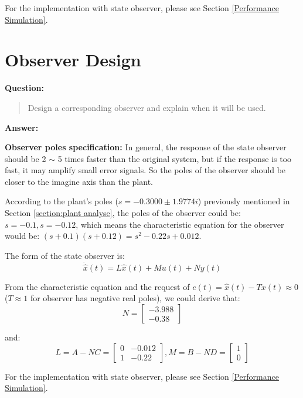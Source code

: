 \documentclass[12pt, oneside]{article}
\begin{document}
For the implementation with state observer, please see Section \ref{Performance Simulation}.


\section{Observer Design}
\textbf{Question:}
\begin{quote}
Design a corresponding observer and explain when it will be used. 
\end{quote}
\textbf{Answer:}

\textbf{Observer poles specification:} In general, the response of the state observer should be 2 $\sim$ 5 times faster than the original system, but if the response is too fast, it may amplify small error signals. So the poles of the observer should be closer to the imagine axis than the plant.

According to the plant's poles ($s = -0.3000\pm1.9774i$) previously mentioned in Section \ref{section:plant analyse}, the poles of the observer could be: $s=-0.1, s=-0.12$, which means the characteristic equation for the observer would be: $(s+0.1)(s+0.12)=s^2-0.22s+0.012$.

The form of the state observer is:
\begin{equation}
    \dot{\hat{x}}(t) = L\hat{x}(t)+Mu(t)+Ny(t)
\end{equation}

From the characteristic equation and the request of $e(t) = \hat{x}(t)-Tx(t) \approx 0$ ($T \approx 1$ for observer has negative real poles), we could derive that:
\begin{equation}
    N = 
    \left[\begin{array}{ccc}-3.988\\-0.38\end{array}\right]
\end{equation}

and:
\begin{equation}
    L = A-NC = \left[\begin{array}{ccc}0&-0.012\\1&-0.22\end{array}\right], 
    M = B-ND = \left[\begin{array}{ccc}1\\0\end{array}\right]
\end{equation}

For the implementation with state observer, please see Section \ref{Performance Simulation}.
\end{document}
